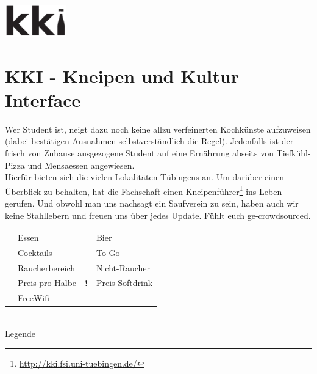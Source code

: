 \newcommand{\no}     {\faIcon{times}}
\newcommand{\yes}    {\faIcon{check}}
\newcommand{\unknown}{\faIcon{question}}

\newcommand{\is}[1]{\ifcsvstrcmp{#1}{}{n.a.}{#1}}
\newcommand{\isUrl}[1]{\ifcsvstrcmp{#1}{}{n.a.}{\small\url{#1}}}

\newcommand{\has}[1]{\ifcsvstrcmp{#1}{0}{\no}{\ifcsvstrcmp{#1}{1}{\yes}{\unknown}}}

\newcommand{\features}[7]{
    \begin{tabular}{c|c|c|c|c|c|c}
        \renewcommand{\arraystretch}{2.5}
        \faIcon{utensils}       & \faIcon{beer}         & \faIcon{cocktail} & \faIcon{wifi}         & 
        \faIcon{shopping-bag}   & \faIcon{smoking}      & \faIcon{smoking-ban}              \\ \hline
        #1 & #2 & #3 & #4 & #5 & #6 & #7
    \end{tabular}
}

\newcommand{\kneipenCSV}{kki/dump.csv}

\centerline{\includegraphics[width=100px]{kki/kki-small.pdf}}

\section*{KKI - Kneipen und Kultur Interface}

Wer Student ist, neigt dazu noch keine allzu verfeinerten Kochkünste aufzuweisen (dabei bestätigen Ausnahmen selbstverständlich die Regel). Jedenfalls ist der frisch von Zuhause ausgezogene Student auf eine Ernährung abseits von Tiefkühl-Pizza und Mensaessen angewiesen.\\
Hierfür bieten sich die vielen Lokalitäten Tübingens an. Um darüber einen Überblick zu behalten, hat die Fachschaft einen Kneipenführer\footnote{\url{http://kki.fsi.uni-tuebingen.de/}} ins Leben gerufen. Und obwohl man uns nachsagt ein Saufverein zu sein, haben auch wir keine Stahllebern und freuen uns über jedes Update. Fühlt euch ge-crowdsourced.

\begin{center}
	\noindent
	\begin{tabular}{cl|cl}
		\faUtensils     & Essen          & \faBeer           & Bier     \\
		\faCocktail     & Cocktails      & \faShoppingBag    & To Go      \\
		\faSmoking      & Raucherbereich & \faSmokingBan     & Nicht-Raucher \\
		\faBeer\faEuroSign               & Preis pro Halbe   & 
		\textbf{!}\faBeer\faEuroSign     & Preis Softdrink\\
		\faWifi           & FreeWifi     &&\\
	\end{tabular}\\
	Legende
\end{center}

